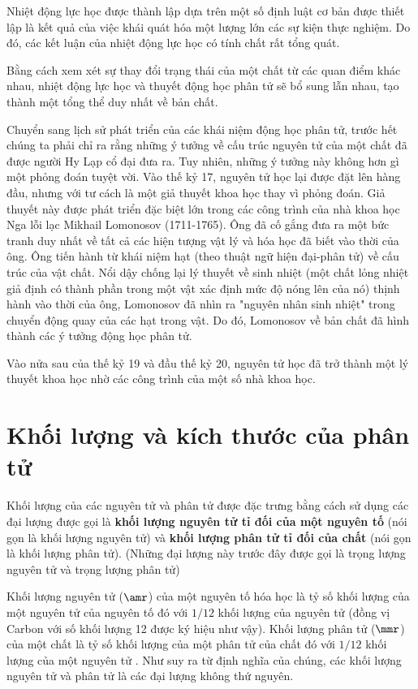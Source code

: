 Nhiệt động lực học được thành lập dựa trên một số định luật cơ bản được thiết lập là kết quả của việc khái quát hóa một lượng lớn các sự kiện thực nghiệm. Do đó, các kết luận của nhiệt động lực học có tính chất rất tổng quát.

Bằng cách xem xét sự thay đổi trạng thái của một chất từ các quan điểm khác nhau, nhiệt động lực học và thuyết động học phân tử sẽ bổ sung lẫn nhau, tạo thành một tổng thể duy nhất về bản chất.

Chuyển sang lịch sử phát triển của các khái niệm động học phân tử, trước hết chúng ta phải chỉ ra rằng những ý tưởng về cấu trúc nguyên tử của một chất đã được người Hy Lạp cổ đại đưa ra. Tuy nhiên, những ý tưởng này không hơn gì một phỏng đoán tuyệt vời. Vào thế kỷ 17, nguyên tử học lại được đặt lên hàng đầu, nhưng với tư cách là một giả thuyết khoa học thay vì phỏng đoán. Giả thuyết này được phát triển đặc biệt lớn trong các công trình của nhà khoa học Nga lỗi lạc Mikhail Lomonosov (1711-1765). Ông đã cố gắng đưa ra một bức tranh duy nhất về tất cả các hiện tượng vật lý và hóa học đã biết vào thời của ông. Ông tiến hành từ khái niệm hạt (theo thuật ngữ hiện đại-phân tử) về cấu trúc của vật chất. Nổi dậy chống lại lý thuyết về sinh nhiệt (một chất lỏng nhiệt giả định có thành phần trong một vật xác định mức độ nóng lên của nó) thịnh hành vào thời của ông, Lomonosov đã nhìn ra "nguyên nhân sinh nhiệt" trong chuyển động quay của các hạt trong vật. Do đó, Lomonosov về bản chất đã hình thành các ý tưởng động học phân tử.

  Vào nửa sau của thế kỷ 19 và đầu thế kỷ 20, nguyên tử học đã trở thành một lý thuyết khoa học nhờ các công trình của một số nhà khoa học.

\section{Khối lượng và kích thước của phân tử}\label{sec:10_2}

Khối lượng của các nguyên tử và phân tử được đặc trưng bằng cách sử dụng các đại lượng được gọi là \textbf{khối lượng nguyên tử tỉ đối của một nguyên tố} (nói gọn là khối lượng nguyên tử) và \textbf{khối lượng phân tử tỉ đối của chất} (nói gọn là khối lượng phân tử). (Những đại lượng này trước đây được gọi là trọng lượng nguyên tử và trọng lượng phân tử)

Khối lượng nguyên tử ($\amr$) của một nguyên tố hóa học là tỷ số khối lượng của một nguyên tử của nguyên tố đó với $1/12$ khối lượng của nguyên tử  (đồng vị Carbon với số khối lượng \num{12} được ký hiệu như vậy). Khối lượng phân tử ($\mmr$) của một chất là tỷ số khối lượng của một phân tử của chất đó với $1/12$ khối lượng của một nguyên tử . Như suy ra từ định nghĩa của chúng, các khối lượng nguyên tử và phân tử là các đại lượng không thứ nguyên.

